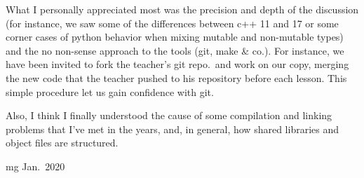 \documentclass[a4paper,11pt]{article}
\begin{document}

\bigskip
What I personally appreciated most was the precision and depth of the
discussion (for instance, we saw some of the differences between c++
11 and 17 or some corner cases of python behavior when mixing mutable
and non-mutable types) and the no non-sense approach to the tools
(git, make \& co.). For instance, we have been invited to fork the
teacher's git repo.\ and work on our copy, merging the new code that
the teacher pushed to his repository before each lesson. This simple
procedure let us gain confidence with git.

Also, I think I finally understood the cause of some compilation and
linking problems that I've met in the years, and, in general, how
shared libraries and object files are structured.

\begin{flushright}
\scriptsize  mg Jan.\ 2020
\end{flushright}
\end{document}
